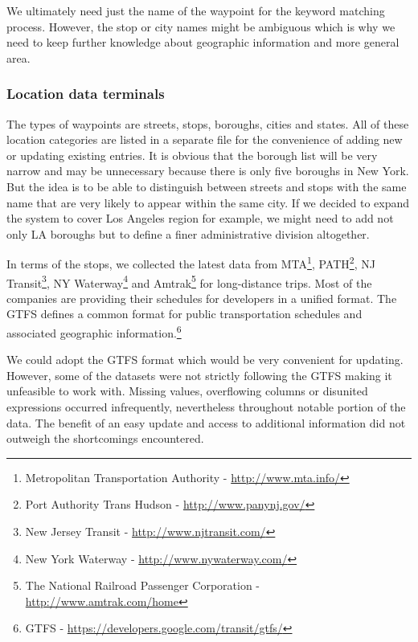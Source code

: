 We ultimately need just the name of the waypoint for the keyword matching process.
However, the stop or city names might be ambiguous which is why we need to keep further knowledge about geographic information and more general area. %

\subsubsection{Location data terminals} \label{sec:terminals}

The types of waypoints are streets, stops, boroughs, cities and states.
All of these location categories are listed in a separate file for the convenience of adding new or updating existing entries.
It is obvious that the borough list will be very narrow and may be unnecessary because there is only five boroughs in New York.
But the idea is to be able to distinguish between streets and stops with the same name that are very likely to appear within the same city.
If we decided to expand the system to cover Los Angeles region for example, we might need to add not only LA boroughs but to define a finer administrative division altogether.

In terms of the stops, we collected the latest data from
MTA\footnote{Metropolitan Transportation Authority - \url{http://www.mta.info/}},
PATH\footnote{Port Authority Trans Hudson - \url{http://www.panynj.gov/}},
NJ Transit\footnote{New Jersey Transit - \url{http://www.njtransit.com/}},
NY Waterway\footnote{New York Waterway - \url{http://www.nywaterway.com/}} and
Amtrak\footnote{The National Railroad Passenger Corporation - \url{http://www.amtrak.com/home}} for long-distance trips.
Most of the companies are providing their schedules for developers in a unified format.
The \acf{GTFS} defines a common format for public transportation schedules and associated geographic information.\footnote{GTFS - \url{https://developers.google.com/transit/gtfs/}}

We could adopt the \ac{GTFS} format which would be very convenient for updating.
However, some of the datasets were not strictly following the \ac{GTFS} making it unfeasible to work with.
Missing values, overflowing columns or disunited expressions occurred infrequently, nevertheless throughout notable portion of the data.
The benefit of an easy update and access to additional information did not outweigh the shortcomings encountered.

